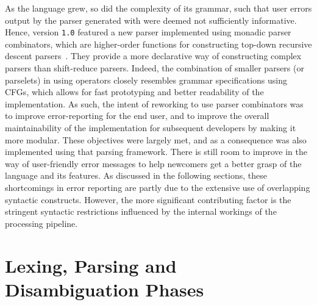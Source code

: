 As the \Beluga language grew, so did the complexity of its grammar, such that user errors output by the parser generated with \CamlpFour were deemed not sufficiently informative.
Hence, \Beluga version \texttt{1.0} featured a new parser implemented using monadic parser combinators, which are higher-order functions for constructing top-down recursive descent parsers~\cite{Burge1975-BURRPT, hutton1996monadic, leijen2001parsec, generalparsercombs, afroozeh2019practical}.
They provide a more declarative way of constructing complex parsers than shift-reduce parsers.
Indeed, the combination of smaller parsers (or parselets) in \OCaml using operators closely resembles grammar specifications using \acp{CFG}, which allows for fast prototyping and better readability of the implementation.
As such, the intent of reworking \Beluga to use parser combinators was to improve error-reporting for the end user, and to improve the overall maintainability of the implementation for subsequent developers by making it more modular.
These objectives were largely met, and as a consequence \Harpoon was also implemented using that parsing framework.
There is still room to improve in the way of user-friendly error messages to help newcomers get a better grasp of the language and its features.
As discussed in the following sections, these shortcomings in error reporting are partly due to the extensive use of overlapping syntactic constructs.
However, the more significant contributing factor is the stringent syntactic restrictions influenced by the internal workings of the processing pipeline.

\section{\Beluga Lexing, Parsing and Disambiguation Phases}\label{section:lexing-parsing-disambiguation}

